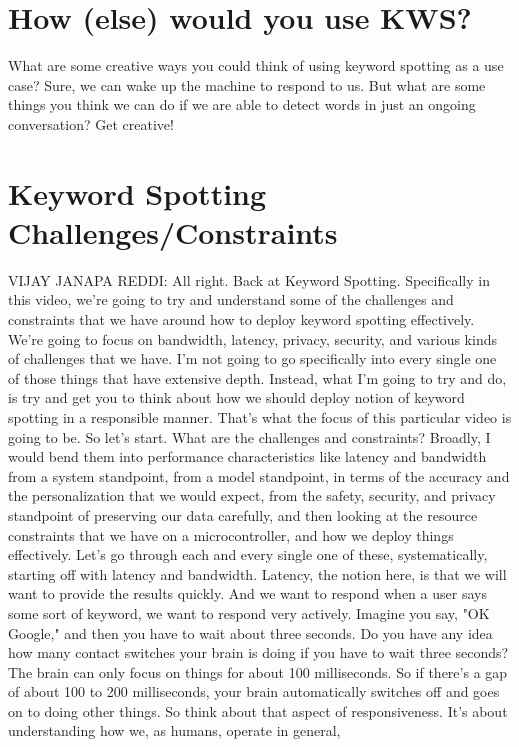 \section{How (else) would you use KWS?}

What are some creative ways  you could think of using keyword spotting as a use case? Sure, we can wake up the machine to respond to us. But what are some things you think we can do if we are able to detect words in just an ongoing conversation? Get creative!

\section{Keyword Spotting Challenges/Constraints}

VIJAY JANAPA REDDI: All right.
Back at Keyword Spotting.
Specifically in this video, we're going to try and understand
some of the challenges and constraints that we have around how
to deploy keyword spotting effectively.
We're going to focus on bandwidth, latency, privacy, security,
and various kinds of challenges that we have.
I'm not going to go specifically into every single one of those things that
have extensive depth.
Instead, what I'm going to try and do, is try and get you
to think about how we should deploy notion of keyword
spotting in a responsible manner.
That's what the focus of this particular video is going to be.
So let's start.
What are the challenges and constraints?
Broadly, I would bend them into performance characteristics
like latency and bandwidth from a system standpoint, from a model standpoint,
in terms of the accuracy and the personalization that we would expect,
from the safety, security, and privacy standpoint
of preserving our data carefully, and then looking at the resource
constraints that we have on a microcontroller,
and how we deploy things effectively.
Let's go through each and every single one of these,
systematically, starting off with latency and bandwidth.
Latency, the notion here, is that we will
want to provide the results quickly.
And we want to respond when a user says some sort of keyword,
we want to respond very actively.
Imagine you say, "OK Google," and then you have to wait about three seconds.
Do you have any idea how many contact switches
your brain is doing if you have to wait three seconds?
The brain can only focus on things for about 100 milliseconds.
So if there's a gap of about 100 to 200 milliseconds,
your brain automatically switches off and goes on to doing other things.
So think about that aspect of responsiveness.
It's about understanding how we, as humans, operate in general,
